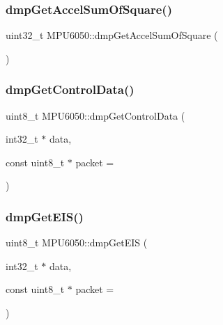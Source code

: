 \mbox{\label{classMPU6050_ab98f49d9a80425fb27a2bc54ba39ae63}} 
\subsubsection{\texorpdfstring{dmpGetAccelSumOfSquare()}{dmpGetAccelSumOfSquare()}}
{\footnotesize\ttfamily uint32\+\_\+t M\+P\+U6050\+::dmp\+Get\+Accel\+Sum\+Of\+Square (\begin{DoxyParamCaption}{ }\end{DoxyParamCaption})}

\mbox{\label{classMPU6050_a7c11e874e2f0009503e0014dd2b1bf85}} 
\subsubsection{\texorpdfstring{dmpGetControlData()}{dmpGetControlData()}}
{\footnotesize\ttfamily uint8\+\_\+t M\+P\+U6050\+::dmp\+Get\+Control\+Data (\begin{DoxyParamCaption}\item[{int32\+\_\+t $\ast$}]{data,  }\item[{const uint8\+\_\+t $\ast$}]{packet = {} }\end{DoxyParamCaption})}

\mbox{\label{classMPU6050_aa57210108896ae4ed01147fac40592e8}} 
\subsubsection{\texorpdfstring{dmpGetEIS()}{dmpGetEIS()}}
{\footnotesize\ttfamily uint8\+\_\+t M\+P\+U6050\+::dmp\+Get\+E\+IS (\begin{DoxyParamCaption}\item[{int32\+\_\+t $\ast$}]{data,  }\item[{const uint8\+\_\+t $\ast$}]{packet = {} }\end{DoxyParamCaption})}

\mbox{\label{classMPU6050_ac2bac2a88ecdca4e0aa399c9d93e4cc3}} 
